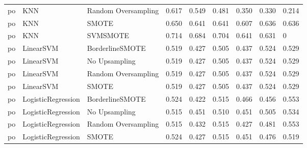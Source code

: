 \begin{tabular}{lllllllll}
      po &                          KNN & Random Oversampling & 0.617 &                     0.549 &                 0.481 &                  0.350 &                                   0.330 &     0.214 \\
      po &                          KNN &               SMOTE & 0.650 &                     0.641 &                 0.641 &                  0.607 &                                   0.636 &     0.636 \\
      po &                          KNN &            SVMSMOTE & 0.714 &                     0.684 &                 0.704 &                  0.641 &                                   0.631 &         0 \\
      po &                    LinearSVM &     BorderlineSMOTE & 0.519 &                     0.427 &                 0.505 &                  0.437 &                                   0.524 &     0.529 \\
      po &                    LinearSVM &       No Upsampling & 0.519 &                     0.427 &                 0.505 &                  0.437 &                                   0.524 &     0.529 \\
      po &                    LinearSVM & Random Oversampling & 0.519 &                     0.427 &                 0.505 &                  0.437 &                                   0.524 &     0.529 \\
      po &                    LinearSVM &               SMOTE & 0.519 &                     0.427 &                 0.505 &                  0.437 &                                   0.524 &     0.529 \\
      po &           LogisticRegression &     BorderlineSMOTE & 0.524 &                     0.422 &                 0.515 &                  0.466 &                                   0.456 &     0.553 \\
      po &           LogisticRegression &       No Upsampling & 0.515 &                     0.451 &                 0.510 &                  0.451 &                                   0.505 &     0.534 \\
      po &           LogisticRegression & Random Oversampling & 0.515 &                     0.432 &                 0.515 &                  0.427 &                                   0.481 &     0.553 \\
      po &           LogisticRegression &               SMOTE & 0.524 &                     0.427 &                 0.515 &                  0.451 &                                   0.476 &     0.519 \\

\end{tabular}
